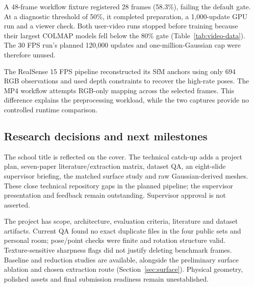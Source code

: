 \documentclass[11pt,a4paper]{article}
\begin{document}
A 48-frame workflow fixture registered 28 frames (58.3\%), failing the
default gate. At a diagnostic threshold of 50\%, it completed preparation,
a 1,000-update GPU run and a viewer check. Both user-video runs stopped
before training because their largest COLMAP models fell below the 80\%
gate (Table~\ref{tab:video-data}). The 30 FPS run's planned 120,000 updates
and one-million-Gaussian cap were therefore unused.

The RealSense 15 FPS pipeline reconstructed its SfM anchors using only
694 RGB observations and used depth constraints to recover the high-rate
poses. The MP4 workflow attempts RGB-only mapping across the selected
frames. This difference explains the preprocessing workload, while the
two captures provide no controlled runtime comparison.

\subsection{Research decisions and next milestones}
The school title is reflected on the cover. The technical
catch-up adds a project plan, seven-paper literature/extraction matrix,
dataset QA, an eight-slide supervisor briefing, the matched surface study
and raw Gaussian-derived meshes. These close technical repository gaps
in the planned pipeline; the supervisor presentation and feedback remain outstanding.
Supervisor approval is not asserted.

The project has scope, architecture, evaluation criteria, literature and
dataset artifacts. Current QA found no exact duplicate files in the four
public sets and personal room; pose/point checks were finite and rotation
structure valid. Texture-sensitive sharpness flags did not justify deleting
benchmark frames. Baseline and reduction studies are available, alongside
the preliminary surface ablation and chosen extraction route
(Section~\ref{sec:surface}). Physical geometry, polished assets and final
submission readiness remain unestablished.
\end{document}
